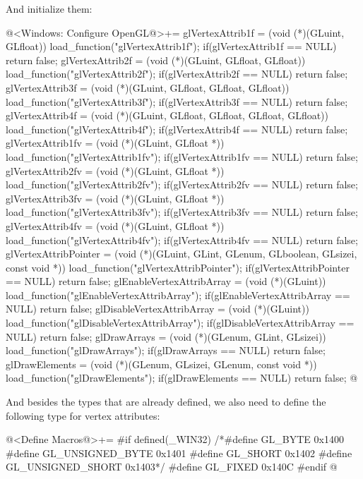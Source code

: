 And initialize them:

\iniciocodigo
@<Windows: Configure OpenGL@>+=
glVertexAttrib1f = (void (*)(GLuint, GLfloat)) load_function("glVertexAttrib1f");
if(glVertexAttrib1f == NULL) return false;
glVertexAttrib2f = (void (*)(GLuint, GLfloat, GLfloat))
                      load_function("glVertexAttrib2f");
if(glVertexAttrib2f == NULL) return false;
glVertexAttrib3f = (void (*)(GLuint, GLfloat, GLfloat, GLfloat))
                      load_function("glVertexAttrib3f");
if(glVertexAttrib3f == NULL) return false;
glVertexAttrib4f = (void (*)(GLuint, GLfloat, GLfloat, GLfloat, GLfloat))
                      load_function("glVertexAttrib4f");
if(glVertexAttrib4f == NULL) return false;
glVertexAttrib1fv = (void (*)(GLuint, GLfloat *))
                       load_function("glVertexAttrib1fv");
if(glVertexAttrib1fv == NULL) return false;
glVertexAttrib2fv = (void (*)(GLuint, GLfloat *))
                       load_function("glVertexAttrib2fv");
if(glVertexAttrib2fv == NULL) return false;
glVertexAttrib3fv = (void (*)(GLuint, GLfloat *))
                       load_function("glVertexAttrib3fv");
if(glVertexAttrib3fv == NULL) return false;
glVertexAttrib4fv = (void (*)(GLuint, GLfloat *))
                       load_function("glVertexAttrib4fv");
if(glVertexAttrib4fv == NULL) return false;
glVertexAttribPointer = (void (*)(GLuint, GLint, GLenum, GLboolean,
                         GLsizei, const void *))
                              load_function("glVertexAttribPointer");
if(glVertexAttribPointer == NULL) return false;
glEnableVertexAttribArray = (void (*)(GLuint))
                              load_function("glEnableVertexAttribArray");
if(glEnableVertexAttribArray == NULL) return false;
glDisableVertexAttribArray = (void (*)(GLuint))
                               load_function("glDisableVertexAttribArray");
if(glDisableVertexAttribArray == NULL) return false;
glDrawArrays = (void (*)(GLenum, GLint, GLsizei)) load_function("glDrawArrays");
if(glDrawArrays == NULL) return false;
glDrawElements = (void (*)(GLenum, GLsizei, GLenum, const void *))
                    load_function("glDrawElements");
if(glDrawElements == NULL) return false;
@
\fimcodigo

And besides the types that are already defined, we also need to define
the following type for vertex attributes:

\iniciocodigo
@<Define Macros@>+=
#if defined(_WIN32)
/*#define GL_BYTE           0x1400
#define GL_UNSIGNED_BYTE  0x1401
#define GL_SHORT          0x1402
#define GL_UNSIGNED_SHORT 0x1403*/
#define GL_FIXED          0x140C
#endif
@
\fimcodigo


